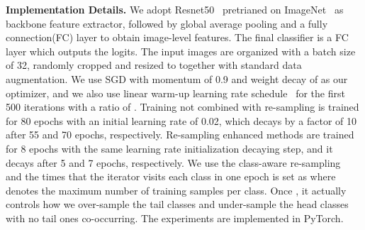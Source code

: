 \documentclass[runningheads]{llncs}
\begin{document}
\noindent\textbf{Implementation Details.}
We adopt Resnet50~\cite{he2016deep} pretrianed on ImageNet~\cite{deng2009imagenet} as backbone feature extractor, followed by global average pooling and a  fully connection(FC) layer to obtain image-level features. The final classifier is a  FC layer which outputs the logits. 
The input images are organized with a batch size of 32, randomly cropped and resized to  together with standard data augmentation.
We use SGD with momentum of 0.9 and weight decay of  as our optimizer, and we also use linear warm-up learning rate schedule~\cite{goyal2017warmup} for the first 500 iterations with a ratio of .
Training not combined with re-sampling is trained for 80 epochs with an initial learning rate of 0.02, which decays by a factor of 10 after 55 and 70 epochs, respectively.
Re-sampling enhanced methods are trained for 8 epochs with the same learning rate initialization decaying step, and it decays after 5 and 7 epochs, respectively.
We use the class-aware re-sampling~\cite{shen2016relay} and the times that the iterator visits each class in one epoch is set as  where  denotes the maximum number of training samples per class. 
Once , it actually controls how we over-sample the tail classes and under-sample the head classes with no tail ones co-occurring. 
The experiments are implemented in PyTorch.
\end{document}
